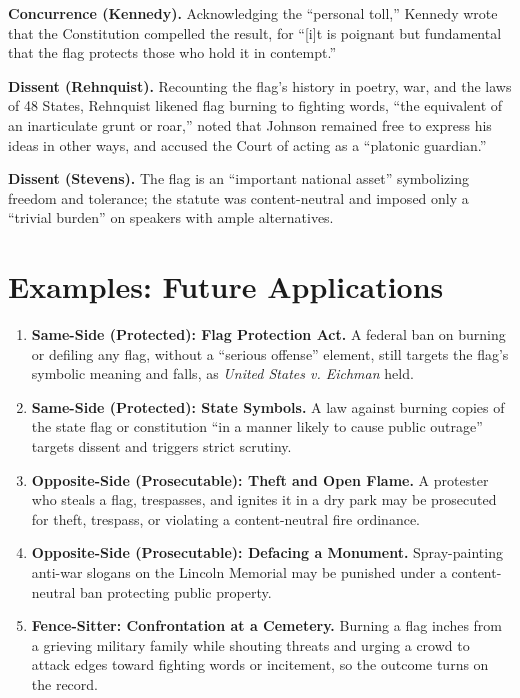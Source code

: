\documentclass[12pt]{article}
\begin{document}
\textbf{Concurrence (Kennedy).} Acknowledging the ``personal toll,'' Kennedy wrote that the Constitution compelled the result, for ``[i]t is poignant but fundamental that the flag protects those who hold it in contempt.''

\textbf{Dissent (Rehnquist).} Recounting the flag's history in poetry, war, and the laws of 48 States, Rehnquist likened flag burning to fighting words, ``the equivalent of an inarticulate grunt or roar,'' noted that Johnson remained free to express his ideas in other ways, and accused the Court of acting as a ``platonic guardian.''

\textbf{Dissent (Stevens).} The flag is an ``important national asset'' symbolizing freedom and tolerance; the statute was content-neutral and imposed only a ``trivial burden'' on speakers with ample alternatives.

\section{Examples: Future Applications}

\begin{enumerate}
\item \textbf{Same-Side (Protected): Flag Protection Act.} A federal ban on burning or defiling any flag, without a ``serious offense'' element, still targets the flag's symbolic meaning and falls, as \textit{United States v. Eichman} held.
\item \textbf{Same-Side (Protected): State Symbols.} A law against burning copies of the state flag or constitution ``in a manner likely to cause public outrage'' targets dissent and triggers strict scrutiny.
\item \textbf{Opposite-Side (Prosecutable): Theft and Open Flame.} A protester who steals a flag, trespasses, and ignites it in a dry park may be prosecuted for theft, trespass, or violating a content-neutral fire ordinance.
\item \textbf{Opposite-Side (Prosecutable): Defacing a Monument.} Spray-painting anti-war slogans on the Lincoln Memorial may be punished under a content-neutral ban protecting public property.
\item \textbf{Fence-Sitter: Confrontation at a Cemetery.} Burning a flag inches from a grieving military family while shouting threats and urging a crowd to attack edges toward fighting words or incitement, so the outcome turns on the record.
\end{enumerate}
\end{document}
